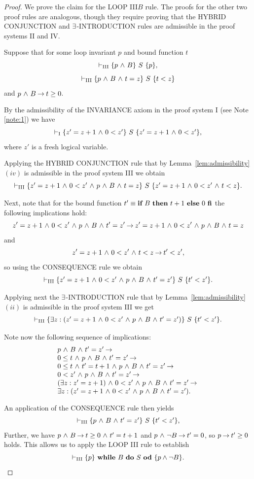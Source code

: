 \documentclass[runningheads]{llncs}       %
\begin{document}
\begin{proof}
  We prove the claim for the LOOP III$B$ rule. The proofs for the
  other two proof rules are analogous, though they require proving
  that the HYBRID CONJUNCTION and $\te$-INTRODUCTION rules are
  admissible in the proof systems II and IV.

  Suppose that for some loop invariant $p$ and bound function $t$
\[
\vdash_{\rm{III}}  \HT{p \A B}{S}{p},
\]
\[
\vdash_{\rm{III}}  \HT{p \A B \A t=z}{S}{t<z}
\]
and
$p \A B \ra t \geq 0$.

By the admissibility of the INVARIANCE axiom in the proof system I (see Note \ref{note:1})
we have
\[
\vdash_{\rm{I}}  \HT{z' = z+1 \A 0 < z'}{S}{z' = z+1 \A 0 < z'},
\]
where $z'$ is a fresh logical variable.

Applying the HYBRID CONJUNCTION rule that by Lemma~\ref{lem:admissibility}$(iv)$
is admissible in the proof system III
we obtain
\[
  \vdash_{\rm{III}}  \HT{z' = z+1 \A 0 < z' \A p \A B \A t=z}{S}{z' = z+1 \A 0 < z' \A t<z}.
\]

Next, note that for the bound function $t' \equiv \ITE{B}{t+1}{0}$
the following implications hold:
\[
  z' = z+1 \A 0 < z' \A p \A B \A t'=z' \ra
    z' = z+1 \A 0 < z' \A p \A B \A t=z
\]
and
\[
  z' = z+1 \A 0 < z' \A t<z \ra t' < z',
\]
so using the CONSEQUENCE rule we obtain
\[
  \vdash_{\rm{III}}  \HT{z' = z+1 \A 0 < z' \A p \A B \A t'=z'}{S}{t'<z'}.
\]

Applying next the $\te$-INTRODUCTION rule that by Lemma~\ref{lem:admissibility}$(ii)$
is admissible in the proof system III we get
\[
  \vdash_{\rm{III}}  \HT{\te z: (z' = z+1 \A 0 < z' \A p \A B \A t'=z')}{S}{t'<z'}.
\]

Note now the following sequence of implications:
\[
  \begin{array}{l}
    p \A B \A t'=z' \ra \\
    0 \leq t \A p \A B \A t'=z' \ra \\
    0 \leq t \A t' = t+1 \A p \A B \A t'=z' \ra \\
    0 < z' \A p \A B \A t'=z' \ra \\
    (\te z: z' = z+1) \A 0 < z' \A p \A B \A t'=z'  \ra \\
    \te z: (z' = z+1 \A 0 < z' \A p \A B \A t'=z'). 
  \end{array}
\]

An application of the CONSEQUENCE rule then yields
\[
\vdash_{\rm{III}}  \HT{p \A B \A t'=z'}{S}{t'<z'},
\]
Further, we have $p \A B \ra t \geq 0 \A t' = t+1$ and 
$p \A \neg B \ra t' = 0$, so 
$p \ra t' \geq 0$ holds.
This allows us to apply the LOOP III rule to establish
\[
\vdash_{\rm{III}}  \HT{p}{\WDD{B}{S}}{p \wedge \neg B}.
\]
\HB  
\end{proof}

%
\end{document}
